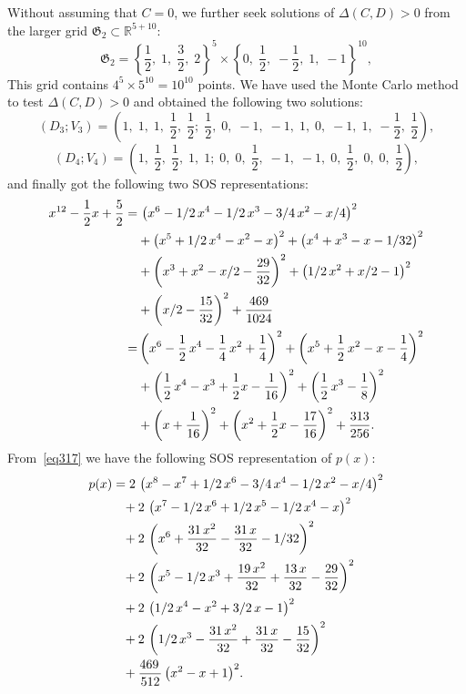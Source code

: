 \documentclass[runningheads]{llncs}
\newcommand{\Qo}{\Delta}
\begin{document}
{Without assuming that $C=0$, we further seek solutions of ${\Qo}(C,D)>0$ from the larger grid \( \mathfrak{G}_2\subset \mathbb{R}^{5+10}\): 
\[
{\mathfrak G}_2 = \left\{ \frac{1}{2},\; 1,\; \frac{3}{2},\; 2 \right\}^5 \times
\left\{ 0,\; \frac{1}{2},\; -\frac{1}{2},\; 1,\; -1 \right\}^{10},
\]
This grid contains \( 4^5 \times 5^{10} = 10^{10} \) points. We have used the Monte Carlo method to test ${\Qo}(C,D)>0$ and obtained the following two solutions:
\[
(D_3;V_3) = \left( 1,\; 1,\; 1,\; \frac{1}{2},\; \frac{1}{2};\;
\frac{1}{2},\; 0,\; -1,\; -1,\; 1,\; 0,\; -1,\; 1,\; -\frac{1}{2},\; \frac{1}{2} \right),
\]
\[
(D_4;V_4) = \left( 1,\; \frac{1}{2},\; \frac{1}{2},\; 1,\; 1;\;
0,\; 0,\; \frac{1}{2},\; -1,\; -1,\; 0,\; \frac{1}{2},\; 0,\; 0,\; \frac{1}{2} \right),
\]
and finally got the following two SOS representations:
\begin{align}
x^{12}-\frac{1}{2}x+\frac{5}{2}=&\, \left( {x}^{6}-1/2\,{x}^{4}-1/2\,{x}^{3}-3/4\,{x}^{2}-x/4 \right)
^{2}\notag \\
&+\left( {x}^{5}+1/2\,{x}^{4}-{x}^{2}-x \right) ^{2}
+\left( {x}^{4}+{x}^{3}-x-1/32 \right) ^{2}
\notag\\
&+\left( {x}^{3}+{x}^{2}
-x/2-{\frac {29}{32}} \right) ^{2}
+\left( 1/2\,{x}^{2}+x/2-1
 \right) ^{2}\notag\\
& +\left( x/2-{\frac {15}{32}} \right) ^{2}+{\frac {469
}{1024}}
\label{eq317}\\
=&
\left( {x}^{6}-\frac{1}{2}\,{x}^{4}-\frac{1}{4}\,{x}^{2}+\frac{1}{4} \right) ^{2}
 + \left( {x}^{5}+\frac{1}{2}\,{x}^{2}-x-\frac{1}{4} \right) ^{2}
 \notag\\
&+\left( \frac{1}{2}\,{x}^{4}-{x}^{3}+\frac{1}{2}x-\frac{1}{16} \right) ^{2}+\left( \frac{1}{2}\,{x}^{3}-\frac{1}{8} \right) ^{2}
\notag\\
&+\left( x+\frac{1}{16} \right) ^{2}+ \left( {x}^{2}+\frac{1}{2}x-{\frac {17}{16}}
 \right) ^{2}+{\frac {313}{256}}.
 \label{2x12x5}
\end{align}
From~\eqref{eq317} we have the following SOS representation of $p(x)$: 
\begin{align}
&p(x)=2\, \left( {x}^{8}-{x}^{7}+1
/2\,{x}^{6}-3/4\,{x}^{4}-1/2\,{x}^{2}-x/4 \right) ^{2}\notag\\
&~~~~~~~~+2\, \left( {x}^
{7}-1/2\,{x}^{6}+1/2\,{x}^{5}-1/2\,{x}^{4}-x \right) ^{2}\notag\\
&~~~~~~~~+2\, \left( {
x}^{6}+{\frac {31\,{x}^{2}}{32}}-{\frac {31\,x}{32}}-1/32 \right) ^{2}\notag\\
&~~~~~~~~
+2\, \left( {x}^{5}-1/2\,{x}^{3}+{\frac {19\,{x}^{2}}{32}}+{\frac {13
\,x}{32}}-{\frac{29}{32}} \right) ^{2}\notag\\
&~~~~~~~~+2\, \left( 1/2\,{x}^{4}-{x}^{2}
+3/2\,x-1 \right) ^{2}\notag\\
&~~~~~~~~+2\, \left( 1/2\,{x}^{3}-{\frac {31\,{x}^{2}}{32
}}+{\frac {31\,x}{32}}-{\frac{15}{32}} \right) ^{2}\notag\\
&~~~~~~~~+{\frac {469\,
 }{512}\left( {x}^{2}-x+1 \right) ^{2}}.
\label{eq-poly-yang-02b}%
\end{align}

}
\end{document}
